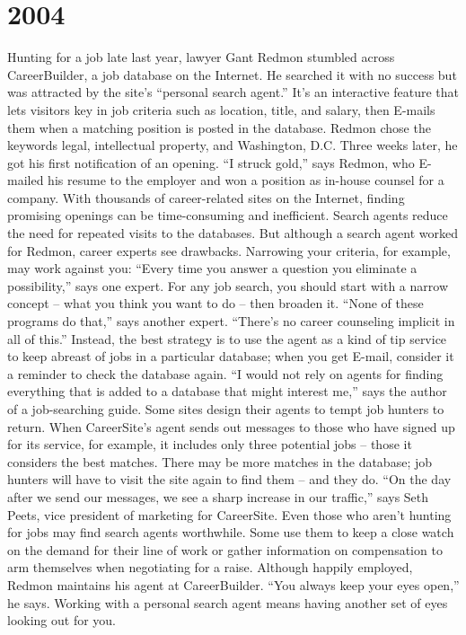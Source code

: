 \section{2004}
Hunting for a job late last year, lawyer Gant Redmon stumbled across CareerBuilder, a job database on the Internet. He searched it with no success but was attracted by the site’s “personal search agent.” It’s an interactive feature that lets visitors key in job criteria such as location, title, and salary, then E-mails them when a matching position is posted in the database. Redmon chose the keywords legal, intellectual property, and Washington, D.C. Three weeks later, he got his first notification of an opening. “I struck gold,” says Redmon, who E-mailed his resume to the employer and won a position as in-house counsel for a company.
With thousands of career-related sites on the Internet, finding promising openings can be time-consuming and inefficient. Search agents reduce the need for repeated visits to the databases. But although a search agent worked for Redmon, career experts see drawbacks. Narrowing your criteria, for example, may work against you: “Every time you answer a question you eliminate a possibility,” says one expert.
For any job search, you should start with a narrow concept -- what you think you want to do -- then broaden it. “None of these programs do that,” says another expert. “There’s no career counseling implicit in all of this.” Instead, the best strategy is to use the agent as a kind of tip service to keep abreast of jobs in a particular database; when you get E-mail, consider it a reminder to check the database again. “I would not rely on agents for finding everything that is added to a database that might interest me,” says the author of a job-searching guide.
Some sites design their agents to tempt job hunters to return. When CareerSite’s agent sends out messages to those who have signed up for its service, for example, it includes only three potential jobs -- those it considers the best matches. There may be more matches in the database; job hunters will have to visit the site again to find them -- and they do. “On the day after we send our messages, we see a sharp increase in our traffic,” says Seth Peets, vice president of marketing for CareerSite.
Even those who aren’t hunting for jobs may find search agents worthwhile. Some use them to keep a close watch on the demand for their line of work or gather information on compensation to arm themselves when negotiating for a raise. Although happily employed, Redmon maintains his agent at CareerBuilder. “You always keep your eyes open,” he says. Working with a personal search agent means having another set of eyes looking out for you.
